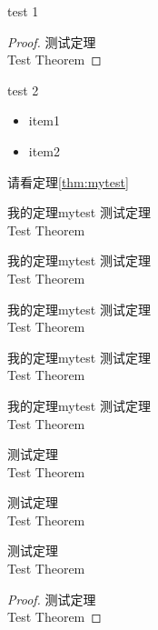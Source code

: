 \documentclass[cn]{../../styles/book/elegantbook/elegantbook}
\begin{document}
\begin{introduction}
\item test 1
\begin{proof}
测试定理 \\
Test Theorem
\end{proof}
\item test 2
\begin{itemize}
\item item1
\item item2
\end{itemize}
\end{introduction}

请看定理\ref{thm:mytest}

\begin{theorem}{我的定理}{mytest}
测试定理 \\
Test Theorem
\end{theorem}

\begin{definition}{我的定理}{mytest}
测试定理 \\
Test Theorem
\end{definition}

\begin{lemma}{我的定理}{mytest}
测试定理 \\
Test Theorem
\end{lemma}

\begin{corollary}{我的定理}{mytest}
测试定理 \\
Test Theorem
\end{corollary}

\begin{proposition}{我的定理}{mytest}
测试定理 \\
Test Theorem
\end{proposition}

\begin{example}
测试定理 \\
Test Theorem
\end{example}

\begin{exercise}
测试定理 \\
Test Theorem
\end{exercise}

\begin{problem}
测试定理 \\
Test Theorem
\end{problem}

\begin{proof}
测试定理 \\
Test Theorem
\end{proof}
\end{document}
